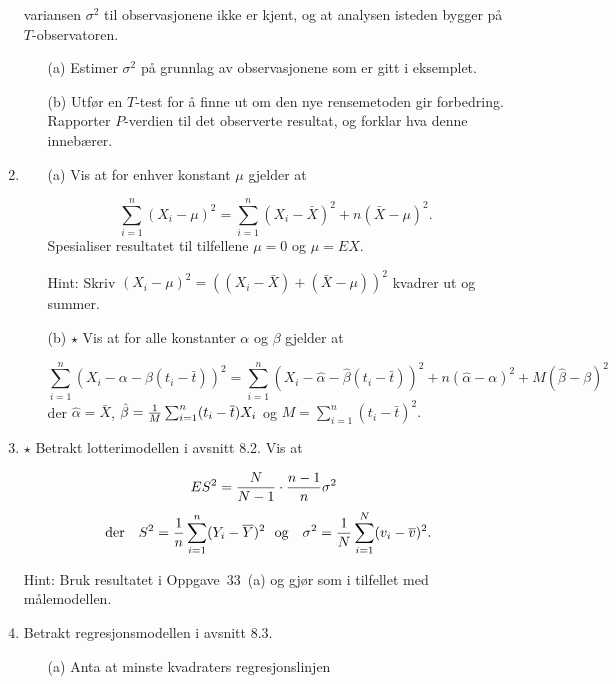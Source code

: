 \begin{enumerate}
          variansen $\sigma ^2$ til observasjonene ikke er kjent,
          og at analysen isteden bygger på $T$-observatoren.
 \begin{itemize}
  \item[(a)]  Estimer $\sigma ^2$ på grunnlag av
               observasjonene som er gitt i eksemplet.
  \item[(b)]  Utfør en $T$-test for å finne ut om den nye
               rensemetoden gir forbedring. Rapporter $P$-verdien
               til det observerte resultat, og forklar hva denne
               innebærer.
 \end{itemize}
\item  
 \begin{itemize}
  \item[(a)]  Vis at for enhver konstant $\mu$ gjelder at 

               \[\sum_{i=1}^n (X_i - \mu)^2 = \sum_{i=1}^n (X_i -
                \bar X )^2 + n (\bar X - \mu)^2.\]
     Spesialiser resultatet til tilfellene $\mu=0$ og $\mu=EX$.

  Hint: Skriv $(X_i - \mu)^2=((X_i -\bar X) + (\bar X - \mu))^2$
 kvadrer ut og summer.

  \item[(b)] $\star$ Vis at for alle konstanter $\alpha$ og $\beta$
               gjelder at

               \[\sum_{i=1}^n (X_i - \alpha - \beta (t_i - \bar
               t))^2=\sum_{i=1}^n (X_i -\hat\alpha -\hat\beta(t_i
               - \bar t))^2 + n(\hat\alpha - \alpha)^2 +
               M(\hat\beta -\beta)^2\]
               der $\hat\alpha= \bar X$, $\hat\beta ={1\over M}\sum_{i=1}^n
              (t_i - \bar t) X_i$ og $M=\sum_{i=1}^n (t_i - \bar t)^2.$
 \end{itemize}
\item  $\star$  Betrakt lotterimodellen i avsnitt 8.2. Vis at 

  \[ES^2={N\over N-1} \cdot {n-1\over n}\sigma ^2 \]
  \[   \mbox{\ \ der \ \ } S^2={1\over n}\sum_{i=1}^n (Y_i -\bar Y)^2
        \mbox{\ \  og \ \ }\sigma ^2={1\over N} \sum_{i=1}^N(v_i-\bar v)^2.\]

     Hint: Bruk resultatet i Oppgave~33~(a) og gjør som i
     tilfellet med målemodellen.

\item   Betrakt regresjonsmodellen i avsnitt 8.3. 
 \begin{itemize}
  \item[(a)]  Anta at minste kvadraters regresjonslinjen
 

\end{itemize}
\end{enumerate}
